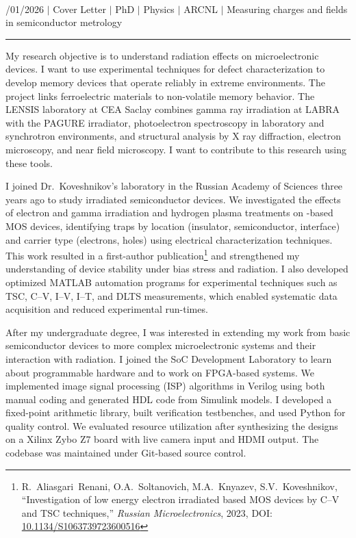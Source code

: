 \documentclass[a4paper,12pt]{article}
\begin{document}
{\centering
  {\scshape {}} \\ 
  {\fontsize{10}{10}/01/2026} $|$
  {\fontsize{10}{10}\selectfont Cover Letter} $|$
  {\fontsize{10}{10}\selectfont PhD} $|$
  {\fontsize{10}{10}\selectfont Physics} $|$
  {\fontsize{10}{10}\selectfont ARCNL} $|$
  {\fontsize{10}{10}\selectfont Measuring charges and fields in semiconductor metrology}
\par}
\vspace{-15pt}
\noindent\rule{\textwidth}{0.5pt}

\vspace{-5pt}

My research objective is to understand radiation effects on microelectronic devices. I want to use experimental techniques for defect characterization to develop memory devices that operate reliably in extreme environments. The project links ferroelectric  materials to non-volatile memory behavior. The LENSIS laboratory at CEA Saclay combines gamma ray irradiation at LABRA with the PAGURE irradiator, photoelectron spectroscopy in laboratory and synchrotron environments, and structural analysis by X ray diffraction, electron microscopy, and near field microscopy. I want to contribute to this research using these tools.

I joined Dr.\ Koveshnikov's laboratory in the Russian Academy of Sciences three years ago to study irradiated semiconductor devices. We investigated the effects of electron and gamma irradiation and hydrogen plasma treatments on -based MOS devices, identifying traps by location (insulator, semiconductor, interface) and carrier type (electrons, holes) using electrical characterization techniques. This work resulted in a first-author publication\footnote{R.~Aliasgari~Renani, O.A.~Soltanovich, M.A.~Knyazev, S.V.~Koveshnikov, ``Investigation of low energy electron irradiated  based MOS devices by C--V and TSC techniques,'' \textit{Russian Microelectronics}, 2023, DOI: \href{https://doi.org/10.1134/S1063739723600516}{10.1134/S1063739723600516}} and strengthened my understanding of device stability under bias stress and radiation. I also developed optimized MATLAB automation programs for experimental techniques such as TSC, C--V, I--V, I--T, and DLTS measurements, which enabled systematic data acquisition and reduced experimental run-times.

After my undergraduate degree, I was interested in extending my work from basic semiconductor devices to more complex microelectronic systems and their interaction with radiation. I joined the SoC Development Laboratory to learn about programmable hardware and to work on FPGA-based systems. We implemented image signal processing (ISP) algorithms in Verilog using both manual coding and generated HDL code from Simulink models. I developed a fixed-point arithmetic library, built verification testbenches, and used Python for quality control. We evaluated resource utilization after synthesizing the designs on a Xilinx Zybo Z7 board with live camera input and HDMI output. The codebase was maintained under Git-based source control. 
\end{document}
